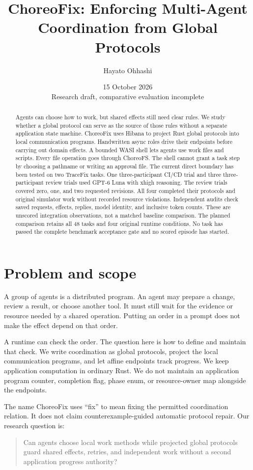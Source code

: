 \documentclass[10pt]{article}
\title{ChoreoFix: Enforcing Multi-Agent Coordination from Global Protocols}
\author{Hayato Ohhashi}
\date{15 October 2026\\Research draft, comparative evaluation incomplete}
\begin{document}
\maketitle
\begin{abstract}
Agents can choose how to work, but shared effects still need clear rules.
We study whether a global protocol can serve as the source of those rules
without a separate application state machine. ChoreoFix uses Hibana to project
Rust global protocols into local communication programs. Handwritten async
roles drive their endpoints before carrying out domain effects. A bounded WASI
shell lets agents use work files and scripts. Every file operation goes through
ChoreoFS. The shell cannot grant a task step by choosing a pathname or writing
an approval file.
The current direct boundary has been tested on two TraceFix tasks.
One three-participant CI/CD trial and three three-participant review trials
used GPT-6 Luna with xhigh reasoning. The review trials covered zero, one,
and two requested revisions. All four completed their protocols and original
simulator work without recorded resource violations. Independent audits check
saved requests, effects, replies, model identity, and inclusive token counts.
These are unscored integration observations, not a matched baseline comparison.
The planned comparison retains all 48 tasks and four original runtime
conditions. No task has passed the complete benchmark acceptance gate and no
scored episode has started.
\end{abstract}

\section{Problem and scope}
A group of agents is a distributed program. An agent may prepare a change,
review a result, or choose another tool. It must still wait for the evidence or
resource needed by a shared operation. Putting an order in a prompt does not
make the effect depend on that order.

A runtime can check the order. The question here is how to define and maintain
that check. We write coordination as global protocols, project the local
communication programs, and let affine endpoints track progress. We keep
application computation in ordinary Rust. We do not maintain an application
program counter, completion flag, phase enum, or resource-owner map alongside
the endpoints.

The name ChoreoFix uses ``fix'' to mean fixing the permitted coordination
relation. It does not claim counterexample-guided automatic protocol repair.
Our research question is:
\begin{quote}
Can agents choose local work methods while projected global protocols guard
shared effects, retries, and independent work without a second application
progress authority?
\end{quote}
\end{document}
